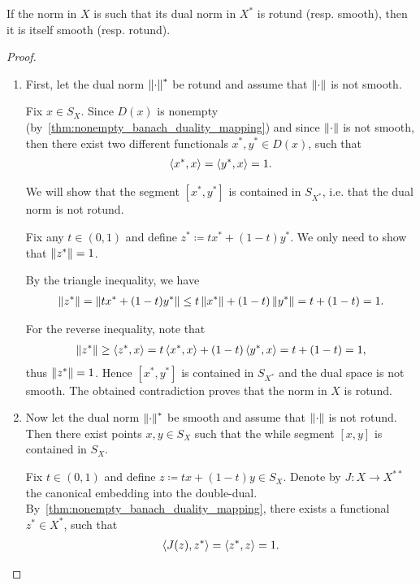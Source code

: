 \begin{theorem}\label{thm:smooth_rotund_norm_duality}\cite[exercise 2.37(a)]{Phelps1993}
  If the norm in \( X \) is such that its dual norm in \( X^* \) is rotund (resp. smooth), then it is itself smooth (resp. rotund).
\end{theorem}
\begin{proof}\mbox{}
  \begin{enumerate}
    \item First, let the dual norm \( \left\Vert \cdot \right\Vert^* \) be rotund and assume that \( \left\Vert \cdot \right\Vert \) is not smooth.

    Fix \( x \in S_X \). Since \( D(x) \) is nonempty (by~\cref{thm:nonempty_banach_duality_mapping}) and since \( \left\Vert \cdot \right\Vert \) is not smooth, then there exist two different functionals \( x^*, y^* \in D(x) \), such that
    \begin{align*}
      \left\langle x^*, x \right\rangle
      =
      \left\langle y^*, x \right\rangle
      =
      1.
    \end{align*}

    We will show that the segment \( [x^*, y^*] \) is contained in \( S_{X^*} \), i.e. that the dual norm is not rotund.

    Fix any \( t \in (0, 1) \) and define \( z^* \coloneqq t x^* + (1-t) y^* \). We only need to show that \( \left\Vert z^* \right\Vert = 1 \).

    By the triangle inequality, we have
    \begin{align*}
      \left\Vert z^* \right\Vert
      =
      \left\Vert t x^* + (1-t) y^* \right\Vert
      \leq
      t \left\Vert x^* \right\Vert + (1-t) \left\Vert y^* \right\Vert
      =
      t + (1-t)
      =
      1.
    \end{align*}

    For the reverse inequality, note that
    \begin{align*}
      \left\Vert z^* \right\Vert
      \geq
      \left\langle z^*, x \right\rangle
      =
      t \left\langle x^*, x \right\rangle + (1-t) \left\langle y^*, x \right\rangle
      =
      t + (1-t)
      =
      1,
    \end{align*}
    thus \( \left\Vert z^* \right\Vert = 1 \). Hence \( [x^*, y^*] \) is contained in \( S_{X^*} \) and the dual space is not smooth. The obtained contradiction proves that the norm in \( X \) is rotund.

    \item Now let the dual norm \( \left\Vert \cdot \right\Vert^* \) be smooth and assume that \( \left\Vert \cdot \right\Vert \) is not rotund. Then there exist points \( x, y \in S_X \) such that the while segment \( [x, y] \) is contained in \( S_X \).

    Fix \( t \in (0, 1) \) and define \( z \coloneqq tx + (1-t)y \in S_X \). Denote by \( J: X \to X^{**} \) the canonical embedding into the double-dual. By~\cref{thm:nonempty_banach_duality_mapping}, there exists a functional \( z^* \in X^* \), such that
    \begin{align*}
      \left\langle J(z), z^* \right\rangle
      =
      \left\langle z^*, z \right\rangle
      =
      1.
    \end{align*}


\end{enumerate}
\end{proof}
